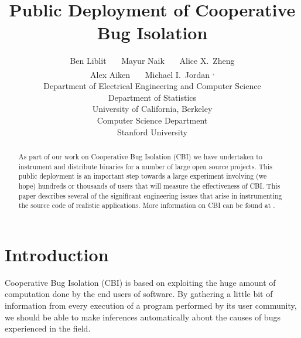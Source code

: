 \documentclass[times,10pt,twocolumn]{article}
\begin{document}
\title{Public Deployment of Cooperative Bug Isolation}

\makeatletter
\newcommand*{\eecsMark}[0]{\@fnsymbol{2}}
\newcommand*{\statMark}[0]{\@fnsymbol{3}}
\newcommand*{\stanMark}[0]{\@fnsymbol{4}}
\makeatother
\newcommand*{\eecs}[0]{\textsuperscript{\eecsMark}}
\newcommand*{\stat}[0]{\textsuperscript{\statMark}}
\newcommand*{\both}[0]{\textsuperscript{\eecsMark, \statMark}}
\newcommand*{\stan}[0]{\textsuperscript{\stanMark}}

\author{
  Ben Liblit \eecs \ \ \ Mayur Naik \stan \ \ \  Alice X.\ Zheng \eecs \\
  Alex Aiken \stan \ \ \ Michael I.\ Jordan \both  \\
 \eecs Department of Electrical Engineering and Computer Science \\ 
  \stat Department of Statistics \\
 University of California, Berkeley \\
 \stan Computer Science Department \\
 Stanford University
}

\maketitle

\begin{abstract}
As part of our work on Cooperative Bug Isolation (CBI) we have undertaken to 
instrument and distribute binaries for a number of large open source projects.
This
public deployment is an important  step towards a large experiment involving (we hope) hundreds or thousands of users that will measure the effectiveness of CBI.
This paper describes several of the significant engineering issues that arise in 
instrumenting the source code of realistic applications.  
More information on CBI can be found at \cite{Liblit:CBIP}.
\end{abstract}

\section{Introduction}

Cooperative Bug Isolation (CBI) is based on exploiting the
huge amount of computation done by the end users of software.  By
gathering a little bit of information from every execution of a
program performed by its user community, we should be able to make
inferences automatically about the causes of bugs experienced in the field.
\end{document}
